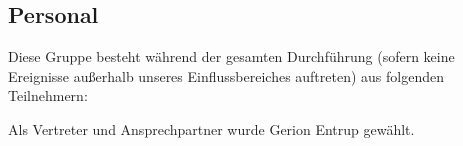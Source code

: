 \subsection{Personal}
\label{subsection:Pflichtenheft-Einfuehrung-Projektumfeld-Personal}

Diese Gruppe besteht während der gesamten Durchführung (sofern keine Ereignisse außerhalb unseres Einflussbereiches auftreten)  aus folgenden Teilnehmern:

\begin{multicols}{2}
    Gerion Entrup

    Martin Matthaei
    
    Sergej Wildemann
    
    Sven Karsten Greiner
    }
\end{multicols}

Als Vertreter und Ansprechpartner wurde Gerion Entrup gewählt.


